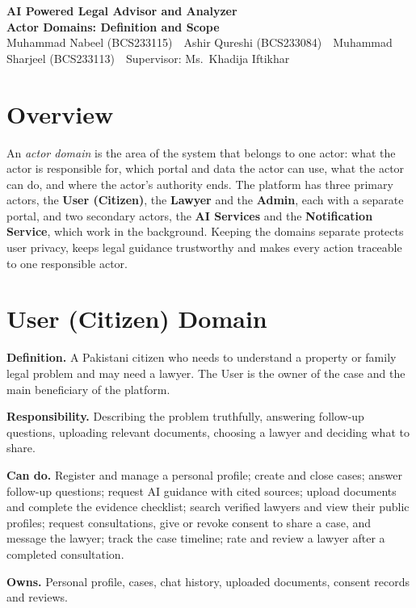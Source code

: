 \documentclass[11pt,a4paper]{article}
\begin{document}
\begin{center}
{\Large\bfseries\color{headteal} AI Powered Legal Advisor and Analyzer}\\[3pt]
{\large\bfseries Actor Domains: Definition and Scope}\\[2pt]
{\small Muhammad Nabeel (BCS233115) \,\textperiodcentered\, Ashir Qureshi (BCS233084) \,\textperiodcentered\, Muhammad Sharjeel (BCS233113) \,\textperiodcentered\, Supervisor: Ms.\ Khadija Iftikhar}
\end{center}

\section{Overview}
An \emph{actor domain} is the area of the system that belongs to one actor: what the actor is responsible for, which portal and data the actor can use, what the actor can do, and where the actor's authority ends. The platform has three primary actors, the \textbf{User (Citizen)}, the \textbf{Lawyer} and the \textbf{Admin}, each with a separate portal, and two secondary actors, the \textbf{AI Services} and the \textbf{Notification Service}, which work in the background. Keeping the domains separate protects user privacy, keeps legal guidance trustworthy and makes every action traceable to one responsible actor.

\section{User (Citizen) Domain}
\textbf{Definition.} A Pakistani citizen who needs to understand a property or family legal problem and may need a lawyer. The User is the owner of the case and the main beneficiary of the platform.

\textbf{Responsibility.} Describing the problem truthfully, answering follow-up questions, uploading relevant documents, choosing a lawyer and deciding what to share.

\textbf{Can do.} Register and manage a personal profile; create and close cases; answer follow-up questions; request AI guidance with cited sources; upload documents and complete the evidence checklist; search verified lawyers and view their public profiles; request consultations, give or revoke consent to share a case, and message the lawyer; track the case timeline; rate and review a lawyer after a completed consultation.

\textbf{Owns.} Personal profile, cases, chat history, uploaded documents, consent records and reviews.
\end{document}
